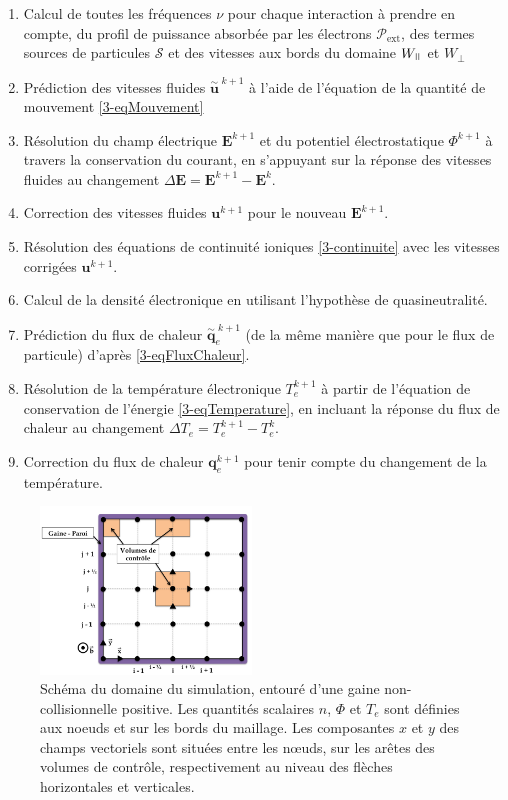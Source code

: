 \begin{refsection}
\begin{enumerate}
  \item Calcul de toutes les fréquences $\nu$ pour
  chaque interaction à prendre en compte, du profil de puissance absorbée par
  les électrons $\mathcal P_\text{ext}$, des termes sources de particules
  $\mathcal{S}$ et des vitesses aux bords du domaine $W_{\para}$ et $W_{\perp}$
  \item Prédiction des vitesses fluides ${\overset{\sim}{\mathbf u}}^{\;k+1}$ à
  l'aide de l'équation de la quantité de mouvement \eqref{3-eqMouvement}
  \item Résolution du champ électrique $\mathbf E^{k+1}$ et du potentiel
  électrostatique $\Phi^{k+1}$ à travers la conservation du courant, en
  s'appuyant sur la réponse des vitesses fluides au changement $\Delta \mathbf
  E=\mathbf E^{k+1}-\mathbf E^{k}$.
  \item Correction des vitesses fluides $\mathbf u^{k+1}$ pour le nouveau
  $\mathbf E^{k+1}$.
  \item Résolution des équations de continuité ioniques \eqref{3-continuite} avec les
  vitesses corrigées $\mathbf u^{k+1}$.
  \item Calcul de la densité électronique en utilisant l'hypothèse de
  quasineutralité.
  \item Prédiction du flux de chaleur ${\overset{\sim}{\mathbf q}}_e^{\;k+1}$
  (de la même manière que pour le flux de particule) d'après
  \eqref{3-eqFluxChaleur}.
  \item Résolution de la température électronique $T_e^{k+1}$ à partir de
  l'équation de conservation de l'énergie \eqref{3-eqTemperature}, en incluant la réponse du flux de
  chaleur au changement $\Delta T_e=T_e^{k+1}-T_e^{k}$.
  \item Correction du flux de chaleur $\mathbf
  q_e^{k+1}$ pour tenir compte du changement de la température.
\end{enumerate}

\begin{figure}[!htbp]
\centering
\includegraphics[width=0.5\textwidth]{figures/3-magnisGrid.png}
{\caption{Schéma du domaine du simulation, entouré d'une gaine
non-collisionnelle positive.
Les quantités scalaires $n$, $\Phi$ et $T_e$ sont définies aux noeuds et sur les
bords du maillage. Les composantes $x$ et $y$ des champs vectoriels sont
situées entre les n\oe uds, sur les arêtes des volumes de contrôle,
respectivement au niveau des flèches horizontales et verticales.}
\label{3-maillage}}
\end{figure}


\end{refsection}
